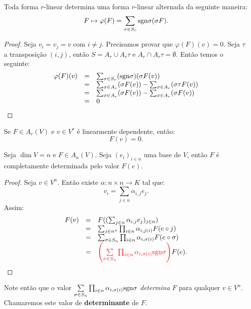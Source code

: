 \documentclass[11pt,twoside,a4paper]{book}
\begin{document}
\begin{proposicao}
Toda forma $r$-linear determina uma forma $r$-linear alternada da seguinte maneira:
\[
F\mapsto\varphi(F)=\sum_{\sigma\in S_r}{\rm sgn}\sigma(\sigma F).
\]
\end{proposicao}
\begin{proof}
Seja $v_i=v_j=v$ com $i\neq j$. Precisamos provar que $\varphi(F)(v)=0$. Seja $\tau$ a transposição $(i,j)$, então $S=A_r\cup A_r\tau$ e $A_r\cap A_r\tau=\emptyset$. Então temos o seguinte:
\[
\begin{array}{rcl}
\varphi(F)(v)&=&\sum_{\sigma\in S_r}({\rm sgn}\sigma)(\sigma F(v))\\&=&\sum_{\sigma\in A_r}(\sigma F(v))-\sum_{\sigma\in A_r}(\sigma\tau F(v))\\&=&\sum_{\sigma\in A_r}(\sigma F(v))-\sum_{\sigma\in A_r}(\sigma F(v))\\&=&0
\end{array}
\]
\end{proof}

\begin{observacao}
Se $F\in A_r(V)$ e $v\in V^r$ é linearmente dependente, então:
\[
F(v)=0.
\]
\end{observacao}

\begin{lema}
Seja $\dim V=n$ e $F\in A_n(V)$. Seja $(e_i)_{i\in n}$ uma base de $V$, então $F$ é completamente determinada pelo valor $F(e)$.
\end{lema}
\begin{proof}
Seja $v\in V^n$. Então existe $\alpha:n\times n\rightarrow K$ tal que:
\[
v_i=\sum_{j\in n}\alpha_{i,j}e_j.
\]
Assim:
\[
\begin{array}{rcl}
F(v)&=&F((\sum_{j\in n}\alpha_{i,j}e_j)_{j\in n})\\&=&\sum_{j\in n^n}\prod_{i\in n}\alpha_{i,j(i)}F(e\circ j)\\&=&\sum_{\sigma\in S_n}\prod_{i\in n}\alpha_{i,\sigma(i)}F(e\circ \sigma)\\&=&\textcolor{red}{\left(\sum\limits_{\sigma\in S_n}\prod_{i\in n}\alpha_{i,\sigma(i)} {\rm sgn}\sigma \right)} F(e).
\end{array}
\]
\end{proof}

\noindent
Note então que o valor $\sum\limits_{\sigma\in S_n}\prod_{i\in n}\alpha_{i,\sigma(i)} {\rm sgn}\sigma$ \emph{determina} $F$ para qualquer $v \in V^n.$ Chamaremos este valor de \textbf{determinante} de $F.$

\begin{exemplo}

\end{exemplo}
\end{document}
